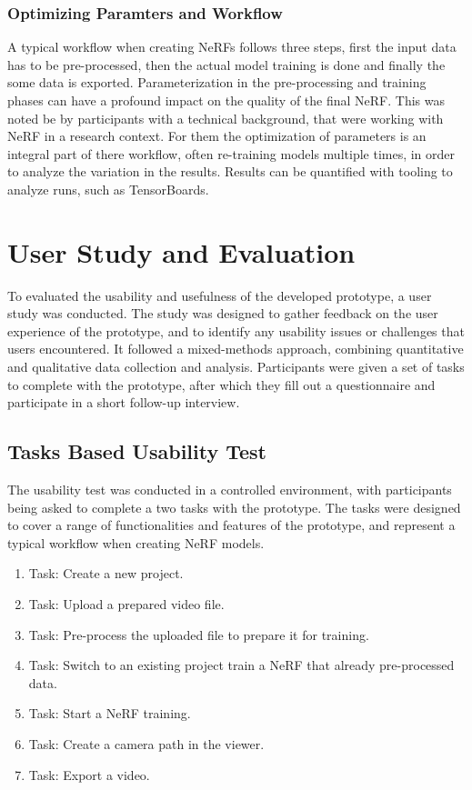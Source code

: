 \subsubsection{Optimizing Paramters and Workflow}

A typical workflow when creating NeRFs follows three steps, first the input data has to be pre-processed, then the actual model training is done and finally the some data is exported. 
Parameterization in the pre-processing and training phases can have a profound impact on the quality of the final NeRF. 
This was noted be by participants with a technical background, that were working with NeRF in a research context.
For them the optimization of parameters is an integral part of there workflow, often re-training models multiple times, in order to analyze the variation in the results.
Results can be quantified with tooling to analyze runs, such as TensorBoards.

\section{User Study and Evaluation}
\label{sec:methodology:study}

To evaluated the usability and usefulness of the developed prototype, a user study was conducted. 
The study was designed to gather feedback on the user experience of the prototype, and to identify any usability issues or challenges that users encountered.
It followed a mixed-methods approach, combining quantitative and qualitative data collection and analysis. 
Participants were given a set of tasks to complete with the prototype, after which they fill out a questionnaire and participate in a short follow-up interview.

\subsection{Tasks Based Usability Test}
\label{sec:methodology:study:tasks}

The usability test was conducted in a controlled environment, with participants being asked to complete a two tasks with the prototype.
The tasks were designed to cover a range of functionalities and features of the prototype, and represent a typical workflow when creating NeRF models.

\begin{enumerate}
  \item Task: Create a new project.
  \item Task: Upload a prepared video file.
  \item Task: Pre-process the uploaded file to prepare it for training.
  \item Task: Switch to an existing project train a NeRF that already pre-processed data.
  \item Task: Start a NeRF training.
  \item Task: Create a camera path in the viewer.
  \item Task: Export a video.
\end{enumerate}

